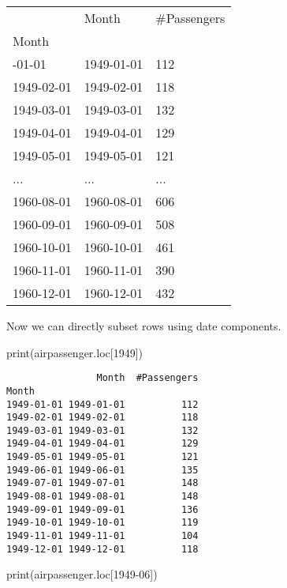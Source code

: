 \documentclass[
  letterpaper,
  DIV=11,
  numbers=noendperiod]{scrreprt}
\newenvironment{Shaded}{\begin{snugshade}}{\end{snugshade}}
\newcommand{\BuiltInTok}[1]{\textcolor[rgb]{0.00,0.23,0.31}{#1}}
\newcommand{\NormalTok}[1]{\textcolor[rgb]{0.00,0.23,0.31}{#1}}
\newcommand{\StringTok}[1]{\textcolor[rgb]{0.13,0.47,0.30}{#1}}
\begin{document}
\begin{longtable}[]{@{}lll@{}}
\toprule\noalign{}
& Month & \#Passengers \\
Month & & \\
\midrule\noalign{}
\endhead
\bottomrule\noalign{}
\endlastfoot
1949-01-01 & 1949-01-01 & 112 \\
1949-02-01 & 1949-02-01 & 118 \\
1949-03-01 & 1949-03-01 & 132 \\
1949-04-01 & 1949-04-01 & 129 \\
1949-05-01 & 1949-05-01 & 121 \\
... & ... & ... \\
1960-08-01 & 1960-08-01 & 606 \\
1960-09-01 & 1960-09-01 & 508 \\
1960-10-01 & 1960-10-01 & 461 \\
1960-11-01 & 1960-11-01 & 390 \\
1960-12-01 & 1960-12-01 & 432 \\
\end{longtable}

Now we can directly subset rows using date components.

\begin{Shaded}
\begin{Highlighting}[]
\BuiltInTok{print}\NormalTok{(airpassenger.loc[}\StringTok{\textquotesingle{}1949\textquotesingle{}}\NormalTok{])}
\end{Highlighting}
\end{Shaded}

\begin{verbatim}
                Month  #Passengers
Month                             
1949-01-01 1949-01-01          112
1949-02-01 1949-02-01          118
1949-03-01 1949-03-01          132
1949-04-01 1949-04-01          129
1949-05-01 1949-05-01          121
1949-06-01 1949-06-01          135
1949-07-01 1949-07-01          148
1949-08-01 1949-08-01          148
1949-09-01 1949-09-01          136
1949-10-01 1949-10-01          119
1949-11-01 1949-11-01          104
1949-12-01 1949-12-01          118
\end{verbatim}

\begin{Shaded}
\begin{Highlighting}[]
\BuiltInTok{print}\NormalTok{(airpassenger.loc[}\StringTok{\textquotesingle{}1949{-}06\textquotesingle{}}\NormalTok{])}
\end{Highlighting}
\end{Shaded}
\end{document}
